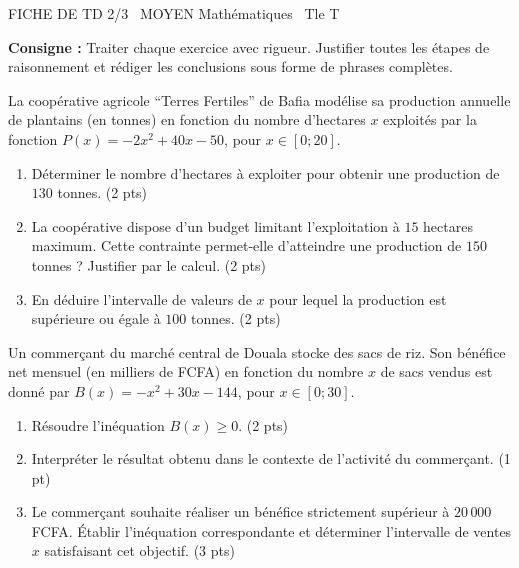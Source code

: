 \documentclass[11pt]{article}
\begin{document}
\begin{tcolorbox}[enhanced,colback=popink,colframe=popink,arc=10pt,boxrule=0pt,left=12pt,right=12pt,top=9pt,bottom=9pt]
{\color{white}\popxbold\small FICHE DE TD 2/3 \textbullet\ MOYEN \hfill Mathématiques \textbullet\ Tle T\par}
\end{tcolorbox}
\vspace{4pt}
\noindent \textbf{Consigne :} Traiter chaque exercice avec rigueur. Justifier toutes les étapes de raisonnement et rédiger les conclusions sous forme de phrases complètes.

\begin{exercice}
La coopérative agricole ``Terres Fertiles'' de Bafia modélise sa production annuelle de plantains (en tonnes) en fonction du nombre d'hectares $x$ exploités par la fonction $P(x) = -2x^2 + 40x - 50$, pour $x \in [0; 20]$.
\begin{enumerate}
    \item Déterminer le nombre d'hectares à exploiter pour obtenir une production de $130$ tonnes. (2 pts)
    \item La coopérative dispose d'un budget limitant l'exploitation à $15$ hectares maximum. Cette contrainte permet-elle d'atteindre une production de $150$ tonnes ? Justifier par le calcul. (2 pts)
    \item En déduire l'intervalle de valeurs de $x$ pour lequel la production est supérieure ou égale à $100$ tonnes. (2 pts)
\end{enumerate}
\end{exercice}

\begin{exercice}
Un commerçant du marché central de Douala stocke des sacs de riz. Son bénéfice net mensuel (en milliers de FCFA) en fonction du nombre $x$ de sacs vendus est donné par $B(x) = -x^2 + 30x - 144$, pour $x \in [0; 30]$.
\begin{enumerate}
    \item Résoudre l'inéquation $B(x) \ge 0$. (2 pts)
    \item Interpréter le résultat obtenu dans le contexte de l'activité du commerçant. (1 pt)
    \item Le commerçant souhaite réaliser un bénéfice strictement supérieur à $20\,000$ FCFA. Établir l'inéquation correspondante et déterminer l'intervalle de ventes $x$ satisfaisant cet objectif. (3 pts)
\end{enumerate}
\end{exercice}
\end{document}
